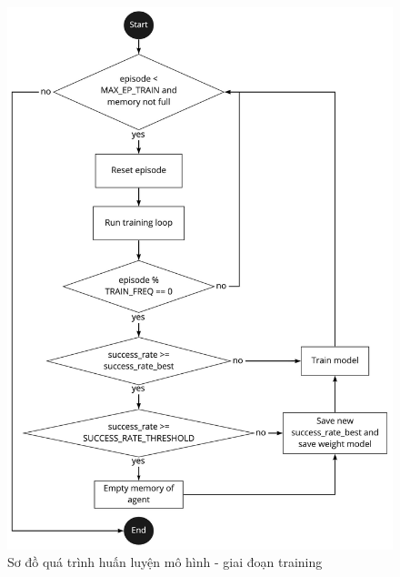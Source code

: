 \begin{center}
    \begin{figure}[!h]
        \begin{center}
         \includegraphics[scale=0.24]{chapter4/img/training_flow.jpg}
        \end{center}
        \caption{Sơ đồ quá trình huấn luyện mô hình - giai đoạn training}
        \label{fig:trainingflow}
    \end{figure}
\end{center}

